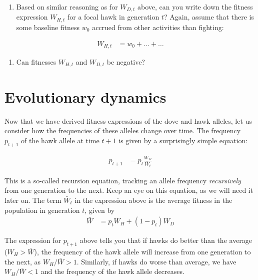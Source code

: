 \documentclass[
]{book}
\providecommand{\tightlist}{%
  \setlength{\itemsep}{0pt}\setlength{\parskip}{0pt}}
\begin{document}
\begin{enumerate}
\def\labelenumi{\arabic{enumi}.}
\tightlist
\item
  Based on similar reasoning as for \(W_{D,t}\) above, can you write down the fitness expression \(W_{H,t}\) for a focal hawk in generation \(t\)? Again, assume that there is some baseline fitness \(w_{0}\) accrued from other activities than fighting:
\end{enumerate}

\begin{align}
W_{H,t} &= w_{0} + \ldots + \ldots
\end{align}

\begin{enumerate}
\def\labelenumi{\arabic{enumi}.}
\setcounter{enumi}{1}
\tightlist
\item
  Can fitnesses \(W_{H,t}\) and \(W_{D,t}\) be negative?
\end{enumerate}

\hypertarget{evolutionary-dynamics}{%
\section{Evolutionary dynamics}\label{evolutionary-dynamics}}

Now that we have derived fitness expressions of the dove and hawk alleles, let us consider how the frequencies of these alleles change over time. The frequency \(p_{t+1}\) of the hawk allele at time \(t+1\) is given by a surprisingly simple equation:

\begin{align}
p_{t+1} &= p_{t}  \frac{W_{H}}{\bar{W}_{t}}
\end{align}

This is a so-called recursion equation, tracking an allele frequency \emph{recursively} from one generation to the next. Keep an eye on this equation, as we will need it later on. The term \(\bar{W}_{t}\) in the expression above is the average fitness in the population in generation \(t\), given by
\begin{align}
\bar{W} &= p_{t} W_{H} + \left(1 - p_{t} \right ) W_{D}
\end{align}

The expression for \(p_{t+1}\) above tells you that if hawks do better than the average (\(W_{H} > \bar{W}\)), the frequency of the hawk allele will increase from one generation to the next, as \(W_{H}/\bar{W} > 1\). Similarly, if hawks do worse than average, we have \(W_{H}/\bar{W} < 1\) and the frequency of the hawk allele decreases.
\end{document}
